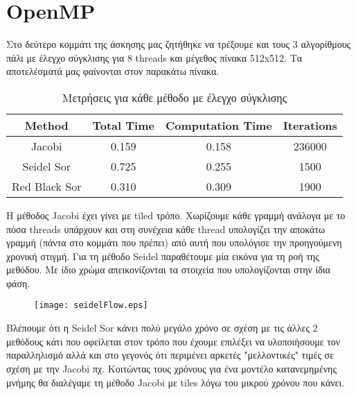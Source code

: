 \documentclass[11pt,a4paper]{article}
\begin{document}
\section*{OpenMP}
Στο δεύτερο κομμάτι της άσκησης μας ζητήθηκε να τρέξουμε και τους 3 αλγορίθμους πάλι με έλεγχο σύγκλισης για 8 threads και μέγεθος πίνακα 512x512. Τα αποτελέσματά
μας φαίνονται στον παρακάτω πίνακα.
\begin{table}[!h]
    \centering
    \begin{tabular}{|c|c|c|c|}
        \hline
        Method & Total Time & Computation Time & Iterations \\
        \hline
        \hline
        Jacobi & 0.159 & 0.158 & 236000\\
        \hline 
        Seidel Sor & 0.725 & 0.255 & 1500\\
        \hline
        Red Black Sor & 0.310 & 0.309 & 1900 \\
        \hline
    \end{tabular}
    \caption{Μετρήσεις για κάθε μέθοδο με έλεγχο σύγκλισης}
\end{table}
H μέθοδος Jacobi έχει γίνει με tiled τρόπο. Χωρίζουμε κάθε γραμμή ανάλογα με το πόσα threads υπάρχουν και στη συνέχεια κάθε thread υπολογίζει την αποκάτω γραμμή
(πάντα στο κομμάτι που πρέπει) από αυτή που υπολόγισε την προηγούμενη χρονική στιγμή. Για τη μέθοδο Seidel παραθέτουμε μία εικόνα για τη ροή της μεθόδου. Με ίδιο 
χρώμα απεικονίζονται τα στοιχεία που υπολογίζονται στην ίδια φάση.
\begin{figure}
    \centering
    \texttt{[image: seidelFlow.eps]}
\end{figure}
Βλέπουμε ότι η Seidel Sor κάνει πολύ μεγάλο χρόνο σε σχέση με τις άλλες 2 μεθόδους κάτι που οφείλεται στον τρόπο που έχουμε επιλέξει να υλοποιήσουμε τον 
παραλληλισμό αλλά και στο γεγονός ότι περιμένει αρκετές "μελλοντικές" τιμές σε σχέση με την Jacobi πχ. 
Κοιτώντας τους χρόνους για ένα μοντέλο κατανεμημένης μνήμης θα διαλέγαμε τη μέθοδο Jacobi με tiles λόγω του μικρού χρόνου που κάνει.
\end{document}
